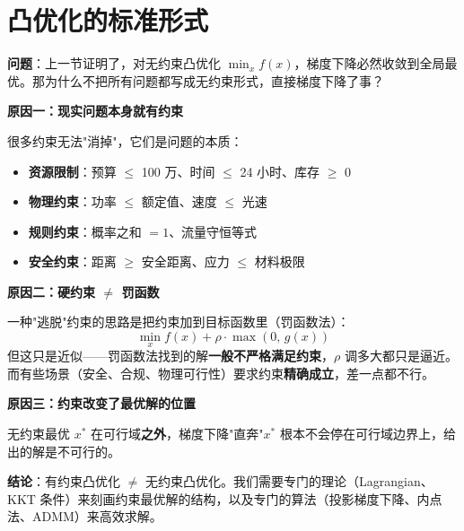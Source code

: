 \documentclass[12pt, a4paper]{ctexart}
\begin{document}
\section{凸优化的标准形式}

\begin{insight}

\textbf{问题}：上一节证明了，对无约束凸优化 $\min_x f(x)$，梯度下降必然收敛到全局最优。那为什么不把所有问题都写成无约束形式，直接梯度下降了事？

\textbf{原因一：现实问题本身就有约束}

很多约束无法"消掉"，它们是问题的本质：
\begin{itemize}
    \item \textbf{资源限制}：预算 $\leq$ 100 万、时间 $\leq$ 24 小时、库存 $\geq$ 0
    \item \textbf{物理约束}：功率 $\leq$ 额定值、速度 $\leq$ 光速
    \item \textbf{规则约束}：概率之和 $= 1$、流量守恒等式
    \item \textbf{安全约束}：距离 $\geq$ 安全距离、应力 $\leq$ 材料极限
\end{itemize}

\textbf{原因二：硬约束 $\neq$ 罚函数}

一种"逃脱"约束的思路是把约束加到目标函数里（罚函数法）：
\[
    \min_x f(x) + \rho \cdot \max(0,\, g(x))
\]
但这只是近似——罚函数法找到的解\textbf{一般不严格满足约束}，$\rho$ 调多大都只是逼近。而有些场景（安全、合规、物理可行性）要求约束\textbf{精确成立}，差一点都不行。

\textbf{原因三：约束改变了最优解的位置}

\begin{center}
\end{center}

无约束最优 $x^*$ 在可行域\textbf{之外}，梯度下降"直奔"$x^*$ 根本不会停在可行域边界上，给出的解是不可行的。

\textbf{结论}：有约束凸优化 $\neq$ 无约束凸优化。我们需要专门的理论（Lagrangian、KKT 条件）来刻画约束最优解的结构，以及专门的算法（投影梯度下降、内点法、ADMM）来高效求解。

\end{insight}
\end{document}

